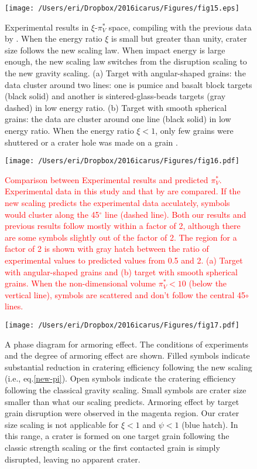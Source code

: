 \documentclass[3p,authoryear]{elsarticle}
\newcommand{\red}[1]{\textcolor{red}{#1}}
\begin{document}
\begin{figure}[htbp]
	\centering
	\texttt{[image: /Users/eri/Dropbox/2016icarus/Figures/fig15.eps]}
	\caption{Experimental results in $\xi$-$\pi_V^*$ space, compiling with the previous data by \citet{schmidt1980, mizutani1983, cintala1999, yamamoto2006, guettler2012, holsapple2014}. When the energy ratio $\xi$ is small but greater than unity, crater size follows the new scaling law. When impact energy is large enough, the new scaling law switches from the disruption scaling to the new gravity scaling. (a) Target with angular-shaped grains: the data cluster around two lines: one is pumice and basalt block targets (black solid) and another is sintered-glass-beads targets (gray dashed) in low energy ratio. (b) Target with smooth spherical grains: the data are cluster around one line (black solid) in low energy ratio. When the energy ratio $\xi<1$, only few grains were shuttered or a crater hole was made on a grain \citep{guettler2012}.}
	\label{xi_vs_newpiV}
	\centering
\end{figure}

\begin{figure}[htbp]
	\centering
	\texttt{[image: /Users/eri/Dropbox/2016icarus/Figures/fig16.pdf]}
	\caption{\red{Comparison between Experimental results and predicted $\pi_V^*$. Experimental data in this study and that by \citet{schmidt1980, mizutani1983, cintala1999, yamamoto2006, guettler2012, holsapple2014} are compared. If the new scaling predicts the experimental data acculately, symbols would cluster along the 45$^\circ$ line (dashed line). Both our results and previous results follow mostly within a factor of 2, although there are some symbols slightly out of the factor of 2. The region for a factor of 2 is shown with gray hatch between the ratio of experimental values to predicted values from 0.5 and 2. (a) Target with angular-shaped grains and (b) target with smooth spherical grains. When the non-dimensional volume $\pi_V^*<10$ (below the vertical line), symbols are scattered and don't follow the central 45$\circ$ lines.}}
	\label{check-new-pi}
	\centering
\end{figure}


\begin{figure}
	\centering
	\texttt{[image: /Users/eri/Dropbox/2016icarus/Figures/fig17.pdf]}
	\caption{A phase diagram for armoring effect. The conditions of experiments and the degree of armoring effect are shown. Filled symbols indicate substantial reduction in cratering efficiency following the new scaling (i.e., eq.\eqref{new-pi}). Open symbols indicate the cratering efficiency following the classical gravity scaling. Small symbols are crater size smaller than what our scaling predicts. Armoring effect by target grain disruption were observed in the magenta region. Our crater size scaling is not applicable for $\xi<1$ and $\psi<1$ (blue hatch). In this range, a crater is formed on one target grain following the classic strength scaling or the first contacted grain is simply disrupted, leaving no apparent crater.}
	\label{psi-xi}
	\centering
\end{figure}
\end{document}
